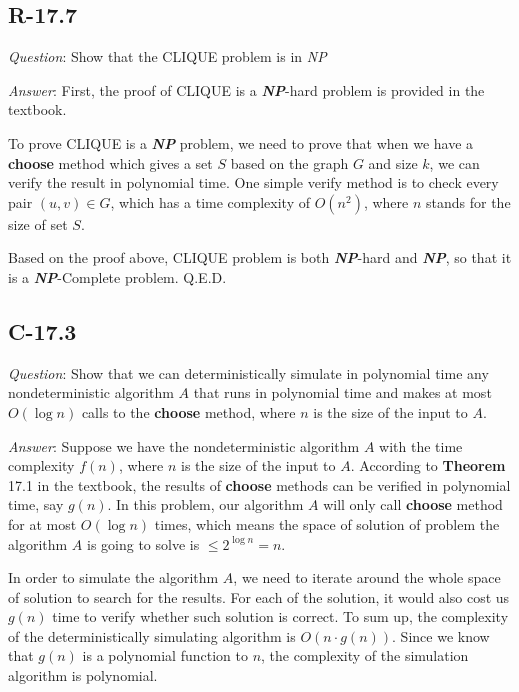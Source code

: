 \documentclass[11pt]{article}
\begin{document}
\subsection{R-17.7}
	\emph{Question}: Show that the CLIQUE problem is in \emph{NP}

\noindent
	\emph{Answer}: First, the proof of CLIQUE is a \emph{\textbf{NP}}-hard problem is provided in the textbook.
	
	To prove CLIQUE is a \emph{\textbf{NP}} problem, we need to prove that when we have a \textbf{choose} method which gives a set $S$ based on the graph $G$ and size $k$, we can verify the result in polynomial time. One simple verify method is to check every pair $(u,v)\in G$, which has a time complexity of $O(n^2)$, where $n$ stands for the size of set $S$.
	
	Based on the proof above, CLIQUE problem is both \emph{\textbf{NP}}-hard and \emph{\textbf{NP}}, so that it is a \emph{\textbf{NP}}-Complete problem. Q.E.D.
\subsection{C-17.3}
	\emph{Question}: Show that we can deterministically simulate in polynomial time any nondeterministic algorithm $A$ that runs in polynomial time and makes at most $O(\log n)$ calls to the \textbf{choose} method, where $n$ is the size of the input to $A$.

\noindent
	\emph{Answer}: Suppose we have the nondeterministic algorithm $A$ with the time complexity $f(n)$, where $n$ is the size of the input to $A$. According to \textbf{Theorem} 17.1 in the textbook, the results of \textbf{choose} methods can be verified in polynomial time, say $g(n)$. In this problem, our algorithm $A$ will only call \textbf{choose} method for at most $O(\log n)$ times, which means the space of solution of problem the algorithm $A$ is going to solve is $\leq 2^{\log n}=n$. 
	
	In order to simulate the algorithm $A$, we need to iterate around the whole space of solution to search for the results. For each of the solution, it would also cost us $g(n)$ time to verify whether such solution is correct. To sum up, the complexity of the deterministically simulating algorithm is $O(n\cdot g(n))$. Since we know that $g(n)$ is a polynomial function to $n$, the complexity of the simulation algorithm is polynomial.
\end{document}
